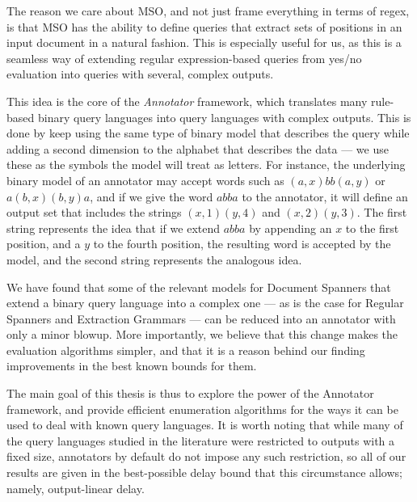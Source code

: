 The reason we care about MSO, and not just frame everything in terms of regex, is that MSO has the ability to define queries that extract sets of positions in an input document in a natural fashion. This is especially useful for us, as this is a seamless way of extending regular expression-based queries from yes/no evaluation into queries with several, complex outputs.


This idea is the core of the {\it Annotator} framework, which translates many rule-based binary query languages into query languages with complex outputs. This is done by keep using the same type of binary model that describes the query while adding a second dimension to the alphabet that describes the data --- we use these as the symbols the model will treat as letters. For instance, the underlying binary model of an annotator may accept words such as  $(a,x)bb(a,y)$ or $a(b,x)(b,y)a$, and if we give the word $abba$ to the annotator, it will define an output set that includes the strings $(x,1)(y,4)$ and $(x,2)(y,3)$. The first string represents the idea that if we extend $abba$ by appending an $x$ to the first position, and a $y$ to the fourth position, the resulting word is accepted by the model, and the second string  represents the analogous idea.

We have found that some of the relevant models for Document Spanners that extend a binary query language into a complex one --- as is the case for Regular Spanners and Extraction Grammars --- can be reduced into an annotator with only a minor blowup. More importantly, we believe that this change makes the evaluation algorithms simpler, and that it is a reason behind our finding improvements in the best known bounds for them.

The main goal of this thesis is thus to explore the power of the Annotator framework, and provide efficient enumeration algorithms for the ways it can be used to deal with known query languages. It is worth noting that while many of the query languages studied in the literature were restricted to outputs with a fixed size, annotators by default do not impose any such restriction, so all of our results are given in the best-possible delay bound that this circumstance allows; namely, output-linear delay.

